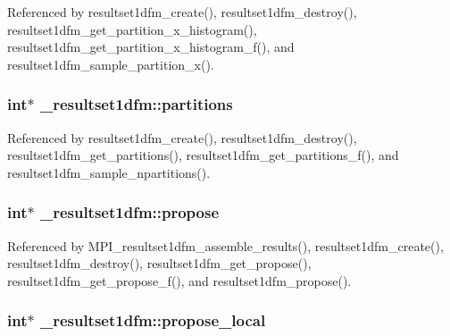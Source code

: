 Referenced by resultset1dfm\+\_\+create(), resultset1dfm\+\_\+destroy(), resultset1dfm\+\_\+get\+\_\+partition\+\_\+x\+\_\+histogram(), resultset1dfm\+\_\+get\+\_\+partition\+\_\+x\+\_\+histogram\+\_\+f(), and resultset1dfm\+\_\+sample\+\_\+partition\+\_\+x().

\subsubsection[{\texorpdfstring{partitions}{partitions}}]{\setlength{\rightskip}{0pt plus 5cm}int$\ast$ \+\_\+resultset1dfm\+::partitions}\hypertarget{struct__resultset1dfm_a90991b169a7704488c71cb36047260b9}{}\label{struct__resultset1dfm_a90991b169a7704488c71cb36047260b9}


Referenced by resultset1dfm\+\_\+create(), resultset1dfm\+\_\+destroy(), resultset1dfm\+\_\+get\+\_\+partitions(), resultset1dfm\+\_\+get\+\_\+partitions\+\_\+f(), and resultset1dfm\+\_\+sample\+\_\+npartitions().

\subsubsection[{\texorpdfstring{propose}{propose}}]{\setlength{\rightskip}{0pt plus 5cm}int$\ast$ \+\_\+resultset1dfm\+::propose}\hypertarget{struct__resultset1dfm_a1caf2d73d2edbdcaae8588a8a61447a9}{}\label{struct__resultset1dfm_a1caf2d73d2edbdcaae8588a8a61447a9}


Referenced by M\+P\+I\+\_\+resultset1dfm\+\_\+assemble\+\_\+results(), resultset1dfm\+\_\+create(), resultset1dfm\+\_\+destroy(), resultset1dfm\+\_\+get\+\_\+propose(), resultset1dfm\+\_\+get\+\_\+propose\+\_\+f(), and resultset1dfm\+\_\+propose().

\subsubsection[{\texorpdfstring{propose\+\_\+local}{propose_local}}]{\setlength{\rightskip}{0pt plus 5cm}int$\ast$ \+\_\+resultset1dfm\+::propose\+\_\+local}\hypertarget{struct__resultset1dfm_a3f6c790571a841a65e43b825be59b958}{}\label{struct__resultset1dfm_a3f6c790571a841a65e43b825be59b958}


